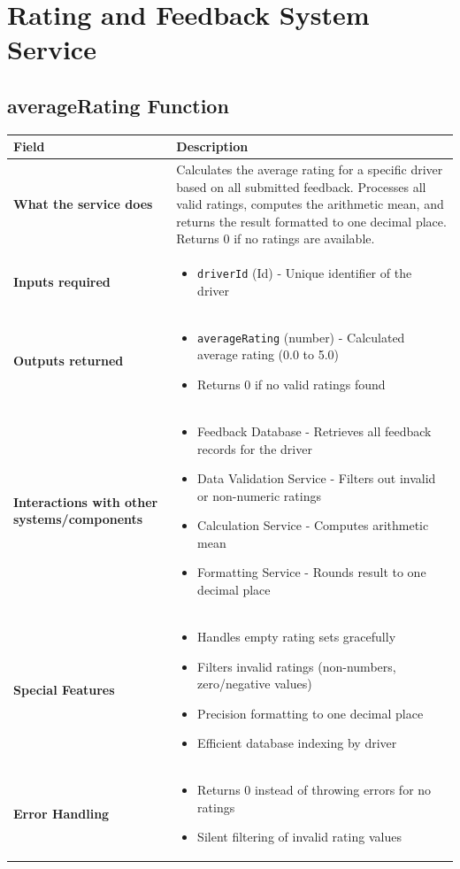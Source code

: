 \documentclass[11pt,a4paper]{article}
\begin{document}
\section{Rating and Feedback System Service}

\subsection{averageRating Function}

\begin{longtable}{|p{3cm}|p{12cm}|}
\hline
\textbf{Field} & \textbf{Description} \\
\hline
\textbf{What the service does} & 
Calculates the average rating for a specific driver based on all submitted feedback. Processes all valid ratings, computes the arithmetic mean, and returns the result formatted to one decimal place. Returns 0 if no ratings are available. \\
\hline
\textbf{Inputs required} & 
\begin{itemize}[nosep]
\item \texttt{driverId} (Id) - Unique identifier of the driver
\end{itemize} \\
\hline
\textbf{Outputs returned} & 
\begin{itemize}[nosep]
\item \texttt{averageRating} (number) - Calculated average rating (0.0 to 5.0)
\item Returns 0 if no valid ratings found
\end{itemize} \\
\hline
\textbf{Interactions with other systems/components} & 
\begin{itemize}[nosep]
\item Feedback Database - Retrieves all feedback records for the driver
\item Data Validation Service - Filters out invalid or non-numeric ratings
\item Calculation Service - Computes arithmetic mean
\item Formatting Service - Rounds result to one decimal place
\end{itemize} \\
\hline
\textbf{Special Features} & 
\begin{itemize}[nosep]
\item Handles empty rating sets gracefully
\item Filters invalid ratings (non-numbers, zero/negative values)
\item Precision formatting to one decimal place
\item Efficient database indexing by driver
\end{itemize} \\
\hline
\textbf{Error Handling} & 
\begin{itemize}[nosep]
\item Returns 0 instead of throwing errors for no ratings
\item Silent filtering of invalid rating values
\end{itemize} \\
\hline
\end{longtable}
\end{document}
